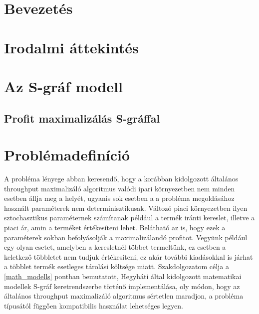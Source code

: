 \documentclass [12pt]{report}
\begin{document}

\setcounter{page}{1}
\tableofcontents

\chapter{Bevezetés}
\setcounter{page}{1}
\chapter{Irodalmi áttekintés}
\chapter{Az S-gráf modell}
\section{Profit maximalizálás S-gráffal}
\chapter{Problémadefiníció}
A probléma lényege abban keresendő, hogy a korábban kidolgozott általános throughput maximalizáló algoritmus \cite{phd_Hegyhati} valódi ipari környezetben nem minden esetben állja meg a helyét, ugyanis sok esetben a a probléma megoldásához használt paraméterek nem determinisztikusak. Változó piaci környezetben ilyen sztochasztikus paraméternek számítanak például a termék iránti kereslet, illetve a piaci ár, amin a terméket értékesíteni lehet. Belátható az is, hogy ezek a paraméterek sokban befolyásolják a maximalizálandó profitot. Vegyünk például egy olyan esetet, amelyben a keresletnél többet termeltünk, ez esetben a keletkező többletet nem tudjuk értékesíteni, ez akár további kiadásokkal is járhat a többlet termék esetleges tárolási költsége miatt. Szakdolgozatom célja a \ref{math_modells} pontban bemutatott, Hegyháti által kidolgozott \cite{phd_Hegyhati} matematikai modellek S-gráf keretrendszerbe történő implementálása, oly módon, hogy az általános throughput maximalizáló algoritmus sértetlen maradjon, a probléma típusától függően kompatibilis használat lehetséges legyen.
\end{document}
